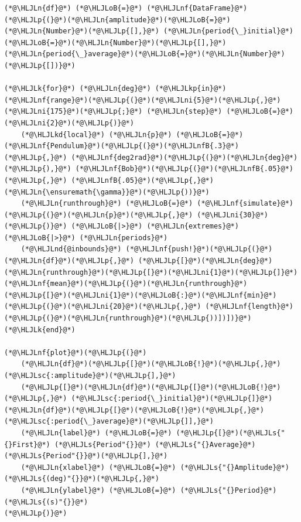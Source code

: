 \documentclass[12pt,a4paper]{article}
\newcommand{\HLJLk}[1]{\textcolor[RGB]{148,91,176}{\textbf{#1}}}
\newcommand{\HLJLkd}[1]{\textcolor[RGB]{214,102,97}{\textit{#1}}}
\newcommand{\HLJLkp}[1]{\textcolor[RGB]{148,91,176}{\textbf{#1}}}
\newcommand{\HLJLn}[1]{#1}
\newcommand{\HLJLnd}[1]{\textcolor[RGB]{214,102,97}{#1}}
\newcommand{\HLJLnf}[1]{\textcolor[RGB]{66,102,213}{#1}}
\newcommand{\HLJLs}[1]{\textcolor[RGB]{201,61,57}{#1}}
\newcommand{\HLJLsc}[1]{\textcolor[RGB]{201,61,57}{#1}}
\newcommand{\HLJLnfB}[1]{\textcolor[RGB]{59,151,46}{#1}}
\newcommand{\HLJLni}[1]{\textcolor[RGB]{59,151,46}{#1}}
\newcommand{\HLJLoB}[1]{\textcolor[RGB]{102,102,102}{\textbf{#1}}}
\newcommand{\HLJLp}[1]{#1}
\begin{document}
\begin{lstlisting}
(*@\HLJLn{df}@*) (*@\HLJLoB{=}@*) (*@\HLJLnf{DataFrame}@*)(*@\HLJLp{(}@*)(*@\HLJLn{amplitude}@*)(*@\HLJLoB{=}@*)(*@\HLJLn{Number}@*)(*@\HLJLp{[],}@*) (*@\HLJLn{period{\_}initial}@*)(*@\HLJLoB{=}@*)(*@\HLJLn{Number}@*)(*@\HLJLp{[],}@*) (*@\HLJLn{period{\_}average}@*)(*@\HLJLoB{=}@*)(*@\HLJLn{Number}@*)(*@\HLJLp{[])}@*)

(*@\HLJLk{for}@*) (*@\HLJLn{deg}@*) (*@\HLJLkp{in}@*) (*@\HLJLnf{range}@*)(*@\HLJLp{(}@*)(*@\HLJLni{5}@*)(*@\HLJLp{,}@*) (*@\HLJLni{175}@*)(*@\HLJLp{;}@*) (*@\HLJLn{step}@*) (*@\HLJLoB{=}@*) (*@\HLJLni{2}@*)(*@\HLJLp{)}@*)
    (*@\HLJLkd{local}@*) (*@\HLJLn{p}@*) (*@\HLJLoB{=}@*) (*@\HLJLnf{Pendulum}@*)(*@\HLJLp{(}@*)(*@\HLJLnfB{.3}@*)(*@\HLJLp{,}@*) (*@\HLJLnf{deg2rad}@*)(*@\HLJLp{(}@*)(*@\HLJLn{deg}@*)(*@\HLJLp{),}@*) (*@\HLJLnf{Bob}@*)(*@\HLJLp{(}@*)(*@\HLJLnfB{.05}@*)(*@\HLJLp{,}@*) (*@\HLJLnfB{.05}@*)(*@\HLJLp{,}@*) (*@\HLJLn{\ensuremath{\gamma}}@*)(*@\HLJLp{))}@*)
    (*@\HLJLn{runthrough}@*) (*@\HLJLoB{=}@*) (*@\HLJLnf{simulate}@*)(*@\HLJLp{(}@*)(*@\HLJLn{p}@*)(*@\HLJLp{,}@*) (*@\HLJLni{30}@*)(*@\HLJLp{)}@*) (*@\HLJLoB{|>}@*) (*@\HLJLn{extremes}@*) (*@\HLJLoB{|>}@*) (*@\HLJLn{periods}@*)
    (*@\HLJLnd{@inbounds}@*) (*@\HLJLnf{push!}@*)(*@\HLJLp{(}@*)(*@\HLJLn{df}@*)(*@\HLJLp{,}@*) (*@\HLJLp{[}@*)(*@\HLJLn{deg}@*) (*@\HLJLn{runthrough}@*)(*@\HLJLp{[}@*)(*@\HLJLni{1}@*)(*@\HLJLp{]}@*) (*@\HLJLnf{mean}@*)(*@\HLJLp{(}@*)(*@\HLJLn{runthrough}@*)(*@\HLJLp{[}@*)(*@\HLJLni{1}@*)(*@\HLJLoB{:}@*)(*@\HLJLnf{min}@*)(*@\HLJLp{(}@*)(*@\HLJLni{20}@*)(*@\HLJLp{,}@*) (*@\HLJLnf{length}@*)(*@\HLJLp{(}@*)(*@\HLJLn{runthrough}@*)(*@\HLJLp{))])])}@*)
(*@\HLJLk{end}@*)

(*@\HLJLnf{plot}@*)(*@\HLJLp{(}@*)
    (*@\HLJLn{df}@*)(*@\HLJLp{[}@*)(*@\HLJLoB{!}@*)(*@\HLJLp{,}@*) (*@\HLJLsc{:amplitude}@*)(*@\HLJLp{],}@*)
    (*@\HLJLp{[}@*)(*@\HLJLn{df}@*)(*@\HLJLp{[}@*)(*@\HLJLoB{!}@*)(*@\HLJLp{,}@*) (*@\HLJLsc{:period{\_}initial}@*)(*@\HLJLp{]}@*) (*@\HLJLn{df}@*)(*@\HLJLp{[}@*)(*@\HLJLoB{!}@*)(*@\HLJLp{,}@*) (*@\HLJLsc{:period{\_}average}@*)(*@\HLJLp{]],}@*)
    (*@\HLJLn{label}@*) (*@\HLJLoB{=}@*) (*@\HLJLp{[}@*)(*@\HLJLs{"{}First}@*) (*@\HLJLs{Period"{}}@*) (*@\HLJLs{"{}Average}@*) (*@\HLJLs{Period"{}}@*)(*@\HLJLp{],}@*)
    (*@\HLJLn{xlabel}@*) (*@\HLJLoB{=}@*) (*@\HLJLs{"{}Amplitude}@*) (*@\HLJLs{(deg)"{}}@*)(*@\HLJLp{,}@*)
    (*@\HLJLn{ylabel}@*) (*@\HLJLoB{=}@*) (*@\HLJLs{"{}Period}@*) (*@\HLJLs{(s)"{}}@*)
(*@\HLJLp{)}@*)
\end{lstlisting}
\end{document}

